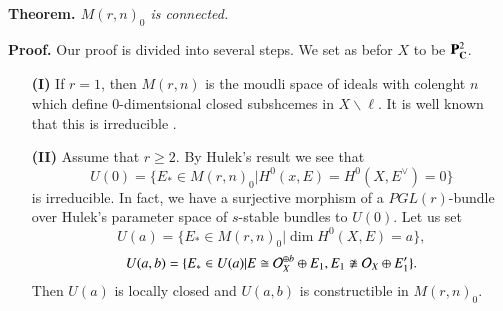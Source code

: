 \medskip
\noindent
{\bfseries {} Theorem. \label{chap12-thm-3.10}} \textit{$M(r,n)_{0}$ is connected.}

\medskip
\noindent
{\bfseries Proof.} Our proof is divided into several steps. We set as befor $X$ to be $\mathbf{P}_{\mathbf{C}}^{2}$.

\begin{itemize}
\item[\bf(I)] If $r=1$, then $M(r,n)$ is the moudli space of ideals with colenght $n$ which define $0$-dimentsional closed subshcemes in $X\backslash \ell$. It is well known that this is irreducible \cite{chap12-key2}.

\item[\bf(II)] Assume that $r \geq 2$. By Hulek's result we see that
$$
U(0)= \{E_{*} \in M (r, n)_{0} | H^{0}(x, E)=H^{0}(X, E^{\vee})= 0\}
$$
is irreducible. In fact, we have a surjective morphism of a $PGL(r)$-bundle over Hulek's parameter space of $s$-stable bundles to $U(0)$. Let us set
$$
U(a)=\{E_{*} \in M (r, n)_{0} | \dim H^{0}(X, E)= a\},
$$
$$
U(a, b) = \{E_{*} \in U(a) | E\cong \mathcal{O}_{X}^{\oplus b} \oplus E_{1}, E_{1} \ncong \mathcal{O}_{X}\oplus E_{1}'\}.
$$
Then $U(a)$ is locally closed and $U(a,b)$ is constructible in $M(r,n)_{0}$.


\end{itemize}
